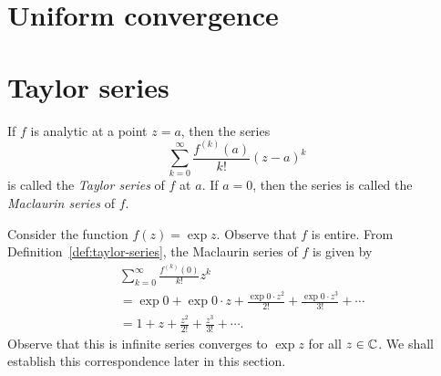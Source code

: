 \section{Uniform convergence}

\section{Taylor series}

\begin{definition}
    If \(f\) is analytic at a point \(z = a\), then the series
    \[
        \sum_{k = 0}^\infty \frac{f^{(k)}(a)}{k!} (z - a)^k
    \]
    is called the \emph{Taylor series} of \(f\) at \(a\). If \(a = 0\), then the
    series is called the \emph{Maclaurin series} of \(f\).
    \label{def:taylor-series}
\end{definition}

\begin{example}
    Consider the function \(f(z) = \exp z\). Observe that \(f\) is entire. From
    Definition~\ref{def:taylor-series}, the Maclaurin series of \(f\) is given
    by 
    \begin{align*}
        &\sum_{k = 0}^\infty \frac{f^{(k)}(0)}{k!} z^k \\
        &= 
        \exp 0 + \exp 0 \cdot z + \frac{\exp 0 \cdot z^2}{2!} + \frac{\exp 0 \cdot z^3}{3!} + \cdots \\
        &= 1 + z + \frac{z^2}{2!} + \frac{z^3}{3!} + \cdots.
    \end{align*}
    Observe that this is infinite series converges to \(\exp z\) for all \(z \in \mathbb{C}\). We shall establish this correspondence later in this section.
\end{example}

